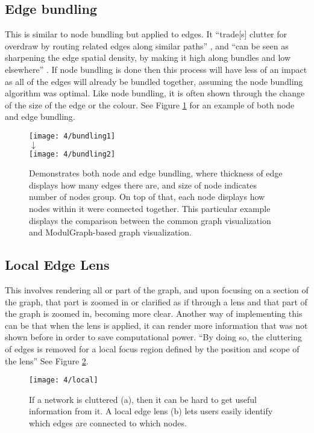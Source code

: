 \documentclass[../dissertation.tex]{subfiles}
\begin{document}
\subsection{Edge bundling}
\label{sec:edge_bundling}
This is similar to node bundling but applied to edges. It ``trade[s] clutter for overdraw by routing related edges along similar paths'' \cite{hurter2012graph}, and ``can be seen as sharpening the edge spatial density, by making it high along bundles and low elsewhere'' \cite{hurter2012graph}. If node bundling is done then this process will have less of an impact as all of the edges will already be bundled together, assuming the node bundling algorithm was optimal. Like node bundling, it is often shown through the change of the size of the edge or the colour. See Figure \ref{fig:bundling} for an example of both node and edge bundling.
\begin{figure}
    \centering
    \texttt{[image: 4/bundling1]}
    \\$\downarrow$\\
    \texttt{[image: 4/bundling2]}
    \caption{Demonstrates both node and edge bundling, where thickness of edge displays how many edges there are, and size of node indicates number of nodes group. On top of that, each node displays how nodes within it were connected together. This particular example displays the comparison between the common graph visualization and ModulGraph-based graph visualization. \cite{li2015modulgraph}}
    \label{fig:bundling}
\end{figure}

\subsection{Local Edge Lens}
This involves rendering all or part of the graph, and upon focusing on a section of the graph, that part is zoomed in or clarified as if through a lens and that part of the graph is zoomed in, becoming more clear. Another way of implementing this can be that when the lens is applied, it can render more information that was not shown before in order to save computational power. ``By doing so, the cluttering of edges is removed for a local focus region defined by the position and scope of the lens'' \cite{tominski2006fisheye} See Figure \ref{fig:local}.
\begin{figure}
    \centering
    \texttt{[image: 4/local]}
    \caption{If a network is cluttered (a), then it can be hard to get useful information from it. A local edge lens (b) lets users easily identify which edges are connected to which nodes. \cite{tominski2006fisheye}}
    \label{fig:local}
\end{figure}
\end{document}
